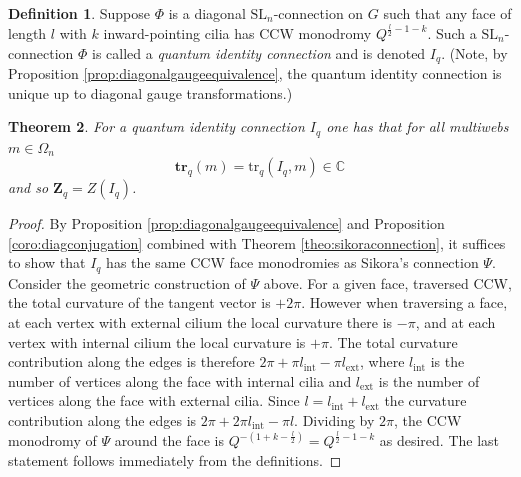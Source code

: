 \documentclass[12pt, reqno]{amsart}
\newtheorem{theo}{Theorem}[section]
\theoremstyle{definition}
\newtheorem{defi}[theo]{Definition}
\newcommand{\Zq}{\mathbf{Z}_q}%
\newcommand{\trqc}{\mathrm{tr}_q}%
\newcommand{\trq}{\mathbf{tr}_q}%
\newcommand{\SL}{\mathrm{SL}}%
\begin{document}
\begin{defi}\label{defi:qidentityconn}
Suppose $\Phi$ is a diagonal $\SL_n$-connection on $G$ such that   any face of length $l$ with $k$ inward-pointing cilia has CCW monodromy $Q^{\frac{l}2-1-k}$.    Such a $\SL_n$-connection $\Phi$ is called a \emph{quantum identity connection} and is denoted $I_q$.    (Note, by Proposition \ref{prop:diagonalgaugeequivalence}, the quantum identity connection is unique up to diagonal gauge transformations.)  
\end{defi}

\begin{theo}\label{theo:quantumidentityconn}
For a quantum identity connection $I_q$ one has that for all multiwebs $m\in\Omega_n$
$$
\trq(m)=\trqc(I_q,m)\in\mathbb{C}
$$
and so $\Zq=Z(I_q)$. 
\end{theo}

\begin{proof} 
By Proposition \ref{prop:diagonalgaugeequivalence} and Proposition \ref{coro:diagconjugation} combined with Theorem \ref{theo:sikoraconnection}, it suffices to show that $I_q$ has the same CCW face monodromies as Sikora's connection $\Psi$. Consider the geometric construction of $\Psi$ above.  For a given face, traversed CCW, the total curvature of the tangent vector is $+2\pi$.   However when traversing a face, at each vertex with external cilium the local curvature there is $-\pi$, and at each vertex with internal cilium the local curvature is $+\pi$. The total curvature contribution along the edges is therefore $2\pi+\pi l_{\mathrm{int}}-\pi l_{\mathrm{ext}}$, where $l_{\mathrm{int}}$ is the number of vertices along the face with internal cilia and $l_{\mathrm{ext}}$ is the number of vertices along the face with external cilia. Since $l=l_{\mathrm{int}}+l_{\mathrm{ext}}$ the curvature contribution along the edges is $2\pi+2\pi l_{\mathrm{int}}-\pi l.$ Dividing by $2\pi$, the CCW monodromy of $\Psi$ around the face is $Q^{-(1+k-\frac{l}{2})}=Q^{\frac{l}2-1-k}$ as desired.  The last statement follows immediately from the definitions.
\end{proof}
\end{document}
